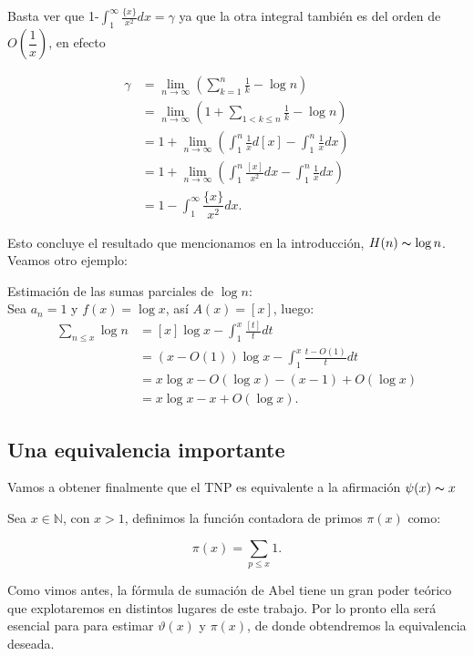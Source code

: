 Basta ver que 1-$\displaystyle\int_1^{\infty}\frac{\{x\}}{x^2}dx=\gamma$ ya que la otra integral también es del orden de $O\left(\dfrac{1}{x}\right)$, en efecto

$$
\begin{aligned}
\gamma & =\lim _{n \rightarrow \infty}\left(\sum_{k=1}^n \frac{1}{k}-\log n\right) \\
& =\lim _{n \rightarrow \infty}\left(1+\sum_{1<k \leq n} \frac{1}{k}-\log n\right) \\
& =1+\lim _{n \rightarrow \infty}\left(\int_1^n \frac{1}{x} d[x]-\int_1^n \frac{1}{x} d x\right) \\
& =1+\lim _{n \rightarrow \infty}\left(\int_1^n \frac{[x]}{x^2} d x-\int_1^n \frac{1}{x} d x\right)\\
&=1-\int_1^{\infty}\dfrac{\{x\}}{x^2}dx.
\end{aligned}
$$

Esto concluye el resultado que mencionamos en la introducción, $H(n)\thicksim \log n$. Veamos otro ejemplo:

\begin{eg}
Estimación de las sumas parciales de $\log n$:\\

Sea $a_n=1$ y $f(x)=\log x$, así $A(x)=[x]$, luego:
$$
\begin{aligned}
\sum_{n \leq x} \log n & =[x] \log x-\int_1^x \frac{[t]}{t} d t \\
& =(x-O(1)) \log x-\int_1^x \frac{t-O(1)}{t} d t \\
& =x \log x-O(\log x)-(x-1)+O(\log x) \\
& =x \log x-x+O(\log x) .
\end{aligned}
$$
\end{eg}

\subsection{Una equivalencia importante}

Vamos a obtener finalmente que el TNP es equivalente a la afirmación $\psi(x)\thicksim x$

\begin{definition}
Sea $x\in \mathbb{N}$, con $x>1$, definimos la función contadora de primos $\pi(x)$ como: 

    $$\pi(x)=\displaystyle\sum_{p\leq x}1.$$
\end{definition}


 Como vimos antes, la fórmula de sumación  de Abel tiene un gran poder teórico que explotaremos en distintos lugares de este trabajo. Por lo pronto ella será esencial para para estimar $\vartheta(x)$ y $\pi(x)$, de donde obtendremos la equivalencia deseada.

